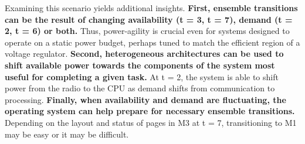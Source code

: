 Examining this scenario yields additional insights. \textbf{First, ensemble
transitions can be the result of changing availability (t = 3, t = 7), demand
(t = 2, t = 6) or both.} Thus, power-agility is crucial even for systems
designed to operate on a static power budget, perhaps tuned to match the
efficient region of a voltage regulator. \textbf{Second, heterogeneous
architectures can be used to shift available power towards the components of
the system most useful for completing a given task.} At t = 2, the system is
able to shift power from the radio to the CPU as demand shifts from
communication to processing. \textbf{Finally, when availability and demand
are fluctuating, the operating system can help prepare for necessary ensemble
transitions.} Depending on the layout and status of pages in M3 at t = 7,
transitioning to M1 may be easy or it may be difficult.

